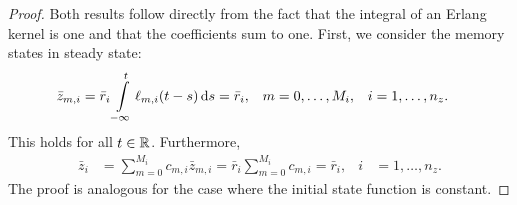 \begin{proof}
	Both results follow directly from the fact that the integral of an Erlang kernel is one and that the coefficients sum to one. First, we consider the memory states in steady state:
	\begin{align}\label{eq:identification:initial:conditions:zm0}
		\bar z_{m, i}
		&= \bar r_i\int\limits_{-\infty}^{t} \ell_{m, i}(t - s) \,\mathrm{d} s
		 = \bar r_i, & m &= 0, \ldots, M_i, & i &= 1, \ldots, n_z.
	\end{align}
	This holds for all $t \in \mathbb{R}$. Furthermore,
	\begin{align}
		\bar z_i &= \sum_{m=0}^{M_i} c_{m, i} \bar z_{m, i} = \bar r_i \sum_{m=0}^{M_i} c_{m, i} = \bar r_i, & i &= 1, \ldots, n_z.
	\end{align}
	The proof is analogous for the case where the initial state function is constant.
\end{proof}
